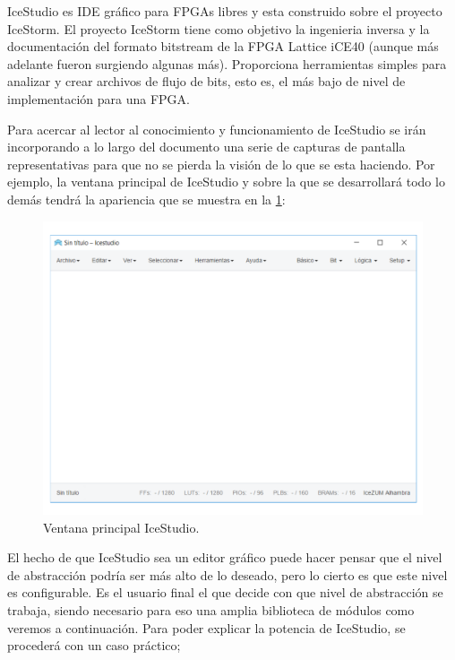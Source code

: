IceStudio es IDE gráfico para FPGAs libres y esta construido sobre el proyecto IceStorm. 
El proyecto IceStorm tiene como objetivo la ingenieria inversa y la documentación del formato bitstream de la FPGA Lattice iCE40 (aunque más adelante fueron surgiendo algunas más). Proporciona herramientas simples para analizar y crear archivos de flujo de bits, esto es, el más bajo de nivel de implementación para una FPGA.\newline

Para acercar al lector al conocimiento y funcionamiento de IceStudio se irán incorporando a lo largo del documento una serie de capturas de pantalla representativas para que no se pierda la visión de lo que se esta haciendo. Por ejemplo, la ventana principal de IceStudio y sobre la que se desarrollará todo lo demás tendrá la apariencia que se muestra en la \ref{fig:Main_IceStudio}: \newline

\begin{figure}[H]
	\center
	\includegraphics[trim = 0mm 20mm 0mm 0mm, clip,scale=0.6]{imagenes/EstadoArte/Main_IceStudio.pdf}
	\caption{Ventana principal IceStudio.}
	\label{fig:Main_IceStudio}
\end{figure}

El hecho de que IceStudio sea un editor gráfico puede hacer pensar que el nivel de abstracción podría ser más alto de lo deseado, pero lo cierto es que este nivel es configurable. \newline
Es el usuario final el que decide con que nivel de abstracción se trabaja, siendo necesario para eso una amplia biblioteca de módulos como veremos a continuación. Para poder explicar la potencia de IceStudio, se procederá con un caso práctico;\newline

